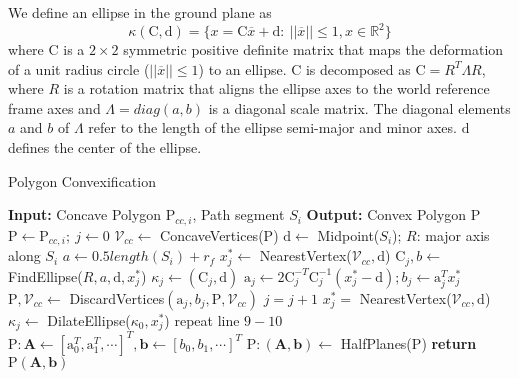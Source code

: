 We define an ellipse in the ground plane as
\begin{equation}
	\kappa(\mathrm{C},\mathrm{d}) = \{x = \mathrm{C} \overline{x} + \mathrm{d}:\ ||\overline{x}||\leq 1, x\in \mathbb{R}^2\}
\end{equation}
where $\mathrm{C}$ is a $2\times2$ symmetric positive definite matrix that maps the deformation of a unit radius circle ($||\overline{x}||\leq 1$) to an ellipse. $\mathrm{C}$ is decomposed as $\mathrm{C} = R^T\Lambda R$, where $R$ is a rotation matrix that aligns the ellipse axes to the world reference frame axes and $\Lambda = diag(a,b)$ is a diagonal scale matrix. The diagonal elements $a$ and $b$ of $\Lambda$ refer to the length of the ellipse semi-major and minor axes. $\mathrm{d}$ defines the center of the ellipse.
\begin{algorithm}
	\caption{Polygon Convexification}\label{algo:convexify}
	\begin{algorithmic}[1]
		\Statex \textbf{Input:} Concave Polygon $\mathrm{P}_{cc,i}$, Path segment $S_i$
		\Statex \textbf{Output:} Convex Polygon $\mathrm{P}$
		\Statex\hrulefill
		\State $\mathrm{P}\gets\mathrm{P}_{cc,i};\ j\gets 0$
		\State $\mathcal{V}_{cc}\gets$ ConcaveVertices($\mathrm{P}$)
		\State $\mathrm{d}\gets$ Midpoint($S_i$); $R$: major axis along $S_i$
		\State $a\gets 0.5length(S_i) + r_f$
		\State $x^*_j \gets$ NearestVertex($\mathcal{V}_{cc}, \mathrm{d}$)
		\State $\mathrm{C}_j,b\gets$ FindEllipse($R,a,\mathrm{d},x^*_j$) 
		\State $\kappa_j\gets (\mathrm{C}_j,\mathrm{d})$
		\State $ \mathrm{a}_j\gets2\mathrm{C}^{-T}_j\mathrm{C}^{-1}_j(x^*_j-\mathrm{d}); b_j\gets \mathrm{a}^T_jx^*_j$
		\State $\mathrm{P},\mathcal{V}_{cc}\gets$ DiscardVertices$(\mathrm{a}_j,b_j, \mathrm{P},\mathcal{V}_{cc})$
		\State $j = j+1$
		\State $x^*_j=$ NearestVertex($\mathcal{V}_{cc}, \mathrm{d}$)
		\State $\kappa_j\gets$ DilateEllipse($\kappa_0, x^*_j$)
		\State repeat line $9-10$
		\EndWhile
		\State $\mathrm{P}:\mathbf{A}\gets[\mathrm{a}^T_0,\mathrm{a}^T_1, \cdots]^T,\mathbf{b}\gets[b_0,b_1,\cdots]^T$
		\Else
		\State  $\mathrm{P}:(\mathbf{A},\mathbf{b})\gets$ HalfPlanes($\mathrm{P}$)
		\EndIf
		\State \textbf{return} $\mathrm{P}(\mathbf{A},\mathbf{b})$
		
	\end{algorithmic}
\end{algorithm}

